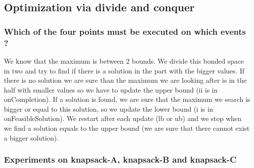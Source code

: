 \documentclass{eplDoc}
\begin{document}
\subsection{Optimization via divide and conquer} %
\subsubsection{Which of the four points must be executed on which events ?}
We know that the maximum is between 2 bounds.  We divide this bonded space in two and try to find if there is a solution in the part with the bigger values.  If there is no solution we are sure than the maximum we are looking after is in the half with smaller values so we have to update the upper bound (ii is in onCompletion).  If a solution is found, we are sure that the maximum we search is bigger or equal to this solution, so we update the lower bound (i is in onFeasibleSolution). We restart after each update (lb or ub) and we stop when we find a solution equals to the upper bound (we are sure that there cannot exist a bigger solution).\\
\subsubsection{Experiments on knapsack-A, knapsack-B and knapsack-C}
\end{document}
